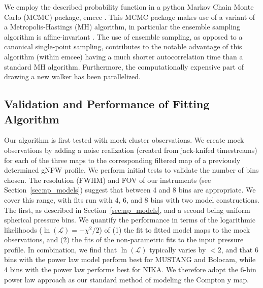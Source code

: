 \documentclass[twocolumn,traditabstract]{aa}
\begin{document}
We employ the described probability function in a python Markov Chain Monte Carlo (MCMC) package, emcee \citep{foreman2013}.
This MCMC package makes use of a variant of a Metropolis-Hastings (MH) algorithm, in particular the ensemble sampling algorithm is
affine-invariant \citep{goodman2010}. The use of ensemble sampling, as opposed to a canonical single-point sampling, contributes
to the notable advantage of this algorithm (within emcee) having a much shorter autocorrelation time than a standard MH algorithm.
Furthermore, the computationally expensive part of drawing a new walker has been parallelized.


\subsection{Validation and Performance of Fitting Algorithm}
\label{sec:validity}

Our algorithm is first tested with mock cluster observations. We create mock observations by adding
a noise realization (created from jack-knifed timestreams) for each of the three maps to the
corresponding filtered map of a previously determined \citep{romero2017} gNFW profile.
We perform initial tests to validate the number of bins chosen. The resolution (FWHM) and FOV of our
instruments (see Section~\ref{sec:np_models}) suggest that between 4 and 8 bins are appropriate.
We cover this range, with fits run with 4, 6, and 8 bins with two model constructions. The first,
as described in Section~\ref{sec:np_models}, and a second being uniform spherical pressure bins.
We quantify the performance in terms of the logarithmic likelihoods ($\ln (\mathcal{L}) = -\chi^2 / 2$)
of (1) the fit to fitted model maps to the mock observations, and (2) the fits of the non-parametric
fits to the input pressure profile. In combination, we find that $\ln (\mathcal{L})$ typically varies
by $<2$, and that 6 bins with the power law model perform best for MUSTANG and Bolocam, while 4 bins
with the power law performs best for NIKA. We therefore adopt the 6-bin power law approach as our
standard method of modeling the Compton y map.
\end{document}
